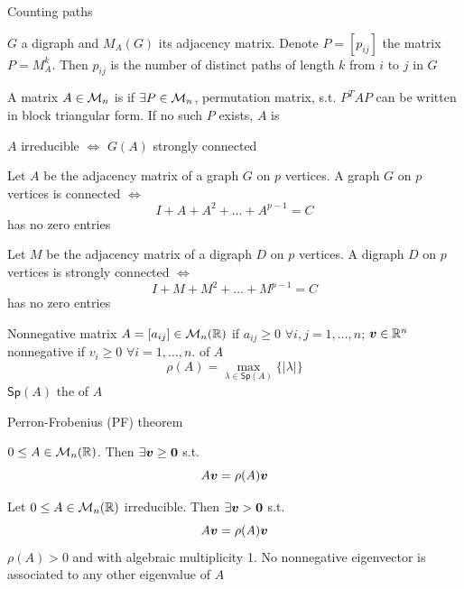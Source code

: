 \documentclass[aspectratio=169]{beamer}\usepackage[]{graphicx}\usepackage[]{xcolor}
\begin{document}
\begin{frame}{Counting paths}
	\begin{theorem}
		$G$ a digraph and $M_A(G)$ its adjacency matrix. Denote $P=[p_{ij}]$ the matrix $P=M_A^k$. Then $p_{ij}$ is the number of distinct paths of length $k$ from $i$ to $j$ in $G$
	\end{theorem}
	\vfill
	\begin{definition}
		A matrix $A\in\mathcal{M}_n$ is  if $\exists P\in\mathcal{M}_n$, permutation matrix, s.t. $P^TAP$ can be written in block triangular form. If no such $P$ exists, $A$ is 
	\end{definition}
	\vfill
	\begin{theorem}
		$A$ irreducible $\iff$ $G(A)$ strongly connected
	\end{theorem}
\end{frame}

\begin{frame}
	\begin{theorem}
		Let $A$ be the adjacency matrix of a graph $G$ on $p$ vertices. 
		A graph $G$ on $p$ vertices is connected $\iff$ $$I+A+A^2+\dots+A^{p-1}=C$$
		has no zero entries
	\end{theorem}
	\vfill
	\begin{theorem}
		Let $M$ be the adjacency matrix of a digraph $D$ on $p$ vertices. 
		A digraph $D$ on $p$ vertices is strongly connected $\iff$ $$I+M+M^2+\dots+M^{p-1}=C$$
		has no zero entries
	\end{theorem}
\end{frame}


\begin{frame}{Nonnegative matrix}
\vfill
$A=[a_{ij}]\in\mathcal{M}_n(\mathbb{R})$  if $a_{ij}\geq 0$ $\forall i,j=1,\ldots,n$; $\bm{v}\in\mathbb{R}^n$ nonnegative if $v_i\geq 0$ $\forall i=1,\ldots,n$.   of $A$
\[
\rho(A) = \max_{\lambda\in\mathsf{Sp}(A)}\{|\lambda|\}
\]
$\mathsf{Sp}(A)$ the  of $A$
\end{frame}

\begin{frame}{Perron-Frobenius (PF) theorem}
\begin{theorem}
$0\leq A\in\mathcal{M}_n(\mathbb{R})$. Then $\exists\bv\geq\b0$ s.t. 
\[
	A\bm{v}=\rho(A)\bm{v}
\]
\end{theorem}
\vfill
\begin{theorem}
	\label{th:PF}
	Let $0\leq A\in \mathcal{M}_n(\mathbb{R})$ irreducible. Then $\exists\bv>\b0$ s.t.
	\[
		A\bm{v}=\rho(A)\bm{v}
	\]
	$\rho(A)>0$ and with algebraic multiplicity 1.
	No nonnegative eigenvector is associated to any other eigenvalue of $A$
\end{theorem}
\end{frame}
\end{document}
